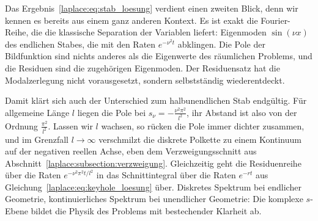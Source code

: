 Das Ergebnis~\eqref{laplace:eq:stab_loesung} verdient einen zweiten Blick,
denn wir kennen es bereits aus einem ganz anderen Kontext.
Es ist exakt die Fourier-Reihe, die die klassische Separation der
Variablen liefert:
Eigenmoden $\sin(\nu x)$ des endlichen Stabes, die mit den Raten
$e^{-\nu^2 t}$ abklingen.
Die Pole der Bildfunktion sind nichts anderes als die Eigenwerte des
räumlichen Problems, und die Residuen sind die zugehörigen Eigenmoden.
Der Residuensatz hat die Modalzerlegung nicht vorausgesetzt, sondern
selbstständig wiederentdeckt.

Damit klärt sich auch der Unterschied zum halbunendlichen Stab endgültig.
Für allgemeine Länge $l$ liegen die Pole bei
$s_\nu = -\frac{\nu^2\pi^2}{l^2}$, ihr Abstand ist also von der Ordnung
$\frac{\pi^2}{l^2}$.
Lassen wir $l$ wachsen, so rücken die Pole immer dichter zusammen, und im
Grenzfall $l \to \infty$ verschmilzt die diskrete Polkette zu einem
Kontinuum auf der negativen reellen Achse, eben dem Verzweigungsschnitt
aus Abschnitt~\ref{laplace:subsection:verzweigung}.
Gleichzeitig geht die Residuenreihe über die Raten $e^{-\nu^2\pi^2 t/l^2}$
in das Schnittintegral über die Raten $e^{-rt}$ aus
Gleichung~\eqref{laplace:eq:keyhole_loesung} über.
Diskretes Spektrum bei endlicher Geometrie, kontinuierliches Spektrum bei
unendlicher Geometrie:
Die komplexe $s$-Ebene bildet die Physik des Problems mit bestechender
Klarheit ab.
